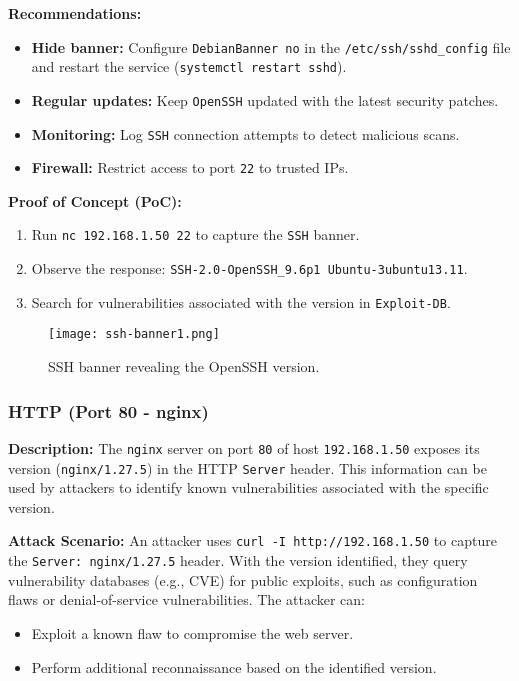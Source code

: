 \documentclass[a4paper,12pt]{article}
\begin{document}
\textbf{Recommendations:}  
\begin{itemize}
    \item \textbf{Hide banner:} Configure \texttt{DebianBanner no} in the \texttt{/etc/ssh/sshd\_config} file and restart the service (\texttt{systemctl restart sshd}).  
    \item \textbf{Regular updates:} Keep \texttt{OpenSSH} updated with the latest security patches.  
    \item \textbf{Monitoring:} Log \texttt{SSH} connection attempts to detect malicious scans.  
    \item \textbf{Firewall:} Restrict access to port \texttt{22} to trusted IPs.  
\end{itemize}

\textbf{Proof of Concept (PoC):}  
\begin{enumerate}
    \item Run \texttt{nc 192.168.1.50 22} to capture the \texttt{SSH} banner.  
    \item Observe the response: \texttt{SSH-2.0-OpenSSH\_9.6p1 Ubuntu-3ubuntu13.11}.  
    \item Search for vulnerabilities associated with the version in \texttt{Exploit-DB}.  
\end{enumerate}

\begin{figure}[ht]
    \centering
    \texttt{[image: ssh-banner1.png]}
    \caption{SSH banner revealing the OpenSSH version.}
\end{figure}

\subsubsection{HTTP (Port 80 - nginx)}
\textbf{Description:}  
The \texttt{nginx} server on port \texttt{80} of host \texttt{192.168.1.50} exposes its version (\texttt{nginx/1.27.5}) in the HTTP \texttt{Server} header. This information can be used by attackers to identify known vulnerabilities associated with the specific version.

\textbf{Attack Scenario:}  
An attacker uses \texttt{curl -I http://192.168.1.50} to capture the \texttt{Server: nginx/1.27.5} header. With the version identified, they query vulnerability databases (e.g., CVE) for public exploits, such as configuration flaws or denial-of-service vulnerabilities. The attacker can:  
\begin{itemize}
    \item Exploit a known flaw to compromise the web server.  
    \item Perform additional reconnaissance based on the identified version.  
\end{itemize}
\end{document}
